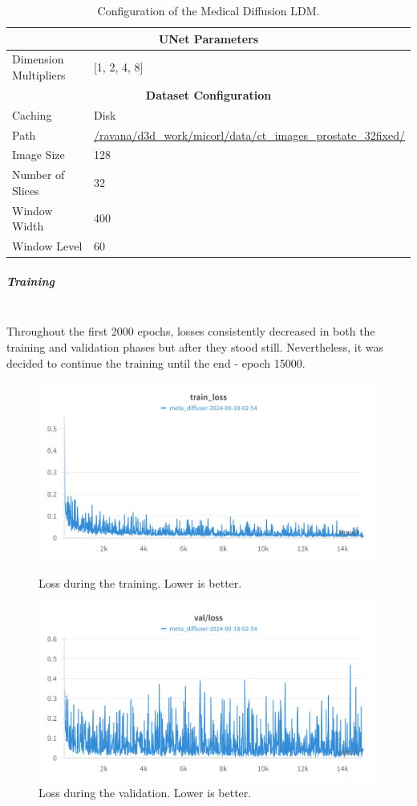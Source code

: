 \begin{table}[H]
\begin{tabular}{|l|l|}
\hline
\multicolumn{2}{|c|}{\textbf{UNet Parameters}} \\
\hline
Dimension Multipliers & [1, 2, 4, 8] \\
\hline
\multicolumn{2}{|c|}{\textbf{Dataset Configuration}} \\
\hline
Caching & Disk \\
\hline
Path & \url{/ravana/d3d_work/micorl/data/ct_images_prostate_32fixed/} \\
\hline
Image Size & 128 \\
\hline
Number of Slices & 32 \\
\hline
Window Width & 400 \\
\hline
Window Level & 60 \\
\hline
\end{tabular}
\caption{Configuration of the Medical Diffusion LDM.}
\label{table:meta_diffuser_params}
\end{table}

\subparagraph{Training}\mbox{}\\

\indent Throughout the first 2000 epochs, losses consistently decreased in both the training and validation phases but after they stood still. Nevertheless, it was decided to continue the training until the end - epoch 15000.
\begin{figure}[H]
\includegraphics[width=\linewidth]{detailed_engineering/Meta Diffusion/charts/train_loss.png}
\caption{Loss during the training. Lower is better.}
\endminipage\hfill
{}
\includegraphics[width=\linewidth]{detailed_engineering/Meta Diffusion/charts/val_loss.png}
\caption{Loss during the validation. Lower is better.}
\endminipage
\end{figure}

